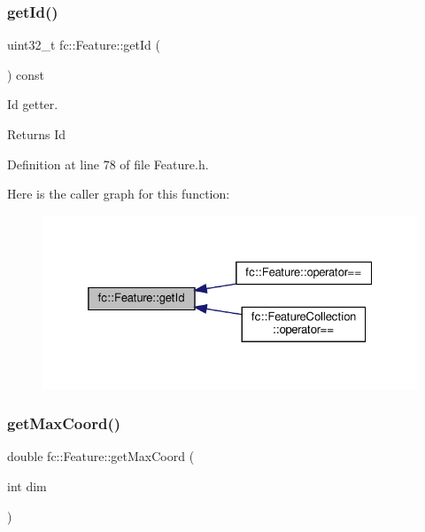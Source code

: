 \subsubsection{\texorpdfstring{get\+Id()}{getId()}}
{\footnotesize\ttfamily uint32\+\_\+t fc\+::\+Feature\+::get\+Id (\begin{DoxyParamCaption}{ }\end{DoxyParamCaption}) const\hspace{0.3cm}{\ttfamily [inline]}}



Id getter. 

\begin{DoxyReturn}{Returns}
Id 
\end{DoxyReturn}


Definition at line 78 of file Feature.\+h.

Here is the caller graph for this function\+:
\nopagebreak
\begin{figure}[H]
\begin{center}
\leavevmode
\includegraphics[width=325pt]{d7/d71/classfc_1_1Feature_aaca79900d55dd3e037e8edfe36330af0_icgraph}
\end{center}
\end{figure}
\mbox{\label{classfc_1_1Feature_acaef36b11296ff7130d9454a0195148d}} 
\subsubsection{\texorpdfstring{get\+Max\+Coord()}{getMaxCoord()}}
{\footnotesize\ttfamily double fc\+::\+Feature\+::get\+Max\+Coord (\begin{DoxyParamCaption}\item[{int}]{dim }\end{DoxyParamCaption})\hspace{0.3cm}{\ttfamily [inline]}}



